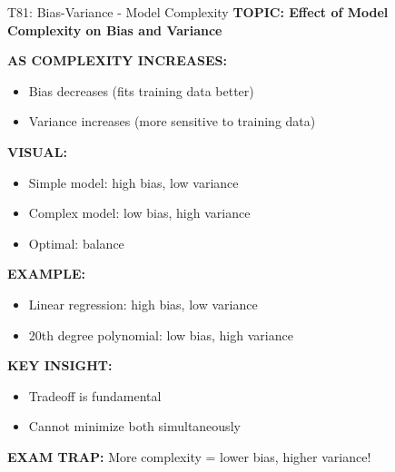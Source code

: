 \documentclass[8pt]{beamer}
\begin{document}
	\begin{frame}{T81: Bias-Variance - Model Complexity}
		\fontsize{6.5}{7.5}\selectfont
		\textbf{TOPIC: Effect of Model Complexity on Bias and Variance}
		
		\vspace{0.1cm}
		\textbf{AS COMPLEXITY INCREASES:}
		\begin{itemize}
			\item Bias decreases (fits training data better)
			\item Variance increases (more sensitive to training data)
		\end{itemize}
		
		\vspace{0.1cm}
		\textbf{VISUAL:}
		\begin{itemize}
			\item Simple model: high bias, low variance
			\item Complex model: low bias, high variance
			\item Optimal: balance
		\end{itemize}
		
		\vspace{0.1cm}
		\textbf{EXAMPLE:}
		\begin{itemize}
			\item Linear regression: high bias, low variance
			\item 20th degree polynomial: low bias, high variance
		\end{itemize}
		
		\vspace{0.1cm}
		\textbf{KEY INSIGHT:}
		\begin{itemize}
			\item Tradeoff is fundamental
			\item Cannot minimize both simultaneously
		\end{itemize}
		
		\textcolor{myred}{\textbf{EXAM TRAP:}} More complexity = \textcolor{myblue}{lower bias, higher variance}!
	\end{frame}
	
\end{document}
